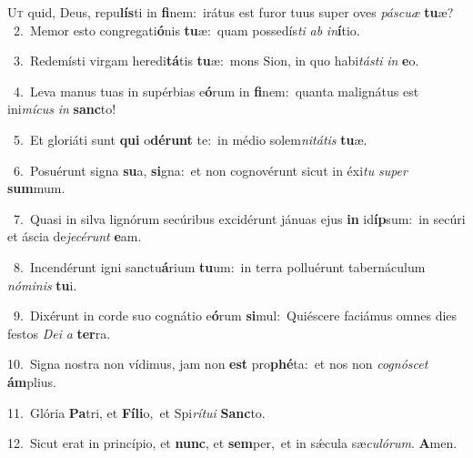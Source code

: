 \lettrine{\initial\textcolor{\initialcolor}{U}}{t} quid, Deus, repu\-\textbf{lís}\-ti in \textbf{fi}\-nem:~\star irátus est furor tuus super oves \textit{pás}\-\textit{cu}\textit{æ} \textbf{tu}\-æ?\\
{\numbfont\textcolor{\numbcolor}{~2.}}~Memor esto congregati\-\textbf{ó}\-nis \textbf{tu}\-æ:~\star quam possedís\textit{ti} \textit{ab} \textit{in}\-\textbf{í}tio.\par
{\numbfont\textcolor{\numbcolor}{~3.}}~Redemísti virgam heredi\-\textbf{tá}\-tis \textbf{tu}\-æ:~\star mons Sion, in quo habi\-\textit{tás}\-\textit{ti} \textit{in} \textbf{e}\-o.\par
{\numbfont\textcolor{\numbcolor}{~4.}}~Leva manus tuas in supérbias e\-\textbf{ó}\-rum in \textbf{fi}\-nem:~\star quanta malignátus est ini\-\textit{mí}\-\textit{cus} \textit{in} \textbf{sanc}\-to!\par
{\numbfont\textcolor{\numbcolor}{~5.}}~Et gloriáti sunt \textbf{qui} o\-\textbf{dé}\-\textbf{runt} te:~\star in médio solem\-\textit{ni}\-\textit{tá}\textit{tis} \textbf{tu}\-æ.\par
{\numbfont\textcolor{\numbcolor}{~6.}}~Posuérunt signa \textbf{su}\-a, \textbf{si}\-gna:~\star et non cognovérunt sicut in éxi\textit{tu} \textit{su}\-\textit{per} \textbf{sum}\-mum.\par
{\numbfont\textcolor{\numbcolor}{~7.}}~Quasi in silva lignórum secúribus excidérunt jánuas ejus \textbf{in} id\-\textbf{íp}\-sum:~\star in secúri et áscia de\-\textit{je}\-\textit{cé}\textit{runt} \textbf{e}\-am.\par
{\numbfont\textcolor{\numbcolor}{~8.}}~Incendérunt igni sanctu\-\textbf{á}\-rium \textbf{tu}\-um:~\star in terra polluérunt tabernáculum \textit{nó}\-\textit{mi}\textit{nis} \textbf{tu}\-i.\par
{\numbfont\textcolor{\numbcolor}{~9.}}~Dixérunt in corde suo cognátio e\-\textbf{ó}\-rum \textbf{si}\-mul:~\star Quiéscere faciámus omnes dies festos \textit{De}\-\textit{i} \textit{a} \textbf{ter}\-ra.\par
{\numbfont\textcolor{\numbcolor}{10.}}~Signa nostra non vídimus, jam non \textbf{est} pro\-\textbf{phé}\-ta:~\star et nos non \textit{co}\-\textit{gnó}\textit{scet} \textbf{ám}\-plius.\par
{\numbfont\textcolor{\numbcolor}{11.}}~Glória \textbf{Pa}\-tri, et \textbf{Fí}\-\textbf{li}o,~\star et Spi\-\textit{rí}\-\textit{tu}\textit{i} \textbf{Sanc}\-to.\par
{\numbfont\textcolor{\numbcolor}{12.}}~Sicut erat in princípio, et \textbf{nunc}\-, et \textbf{sem}\-per,~\star et in sǽcula sæ\-\textit{cu}\-\textit{ló}\textit{rum}. \textbf{A}\-men.\par
